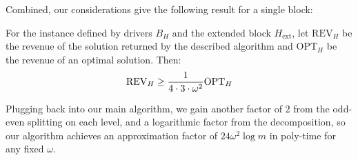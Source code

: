 Combined, our considerations give the following result for a single block:

\begin{lemma}
For the instance defined by drivers $B_H$ and the extended block $H_{\mathrm{ext}}$, let $\mathrm{REV}_H$ be the revenue of the solution returned by the described algorithm and 
$\mathrm{OPT}_H$ be the revenue of an optimal solution. Then:
\[ \mathrm{REV}_H \geq \frac{1}{4 \cdot 3 \cdot \omega^2} \mathrm{OPT}_H \]
\end{lemma}

Plugging 
back into our main algorithm, we gain another factor of $2$ from the odd-even splitting on each level, and a logarithmic factor from the decomposition, so our algorithm 
achieves an approximation factor of $24 \omega^2 \log m$ in poly-time for any fixed 
$\omega$.
